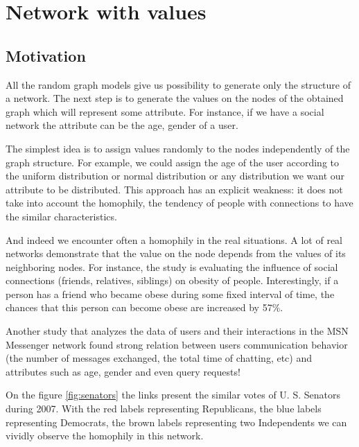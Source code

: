 \documentclass[12pt]{report}
\begin{document}
\section{Network with values}

\subsection{Motivation}

All the random graph models give us possibility to generate only the structure of a network. The next step is to generate the values on the nodes of the obtained graph which will represent some attribute. For instance, if we have a social network the attribute can be the age, gender of a user.  

The simplest idea is to assign values randomly to the nodes independently of the graph structure. For example, we could assign the age of the user according to the uniform distribution or normal distribution or any distribution we want our attribute to be distributed. This approach has an explicit weakness: it does not take into account the homophily, the tendency of people with connections to have the similar characteristics.

And indeed we encounter often a homophily in the real situations. A lot of real networks demonstrate that the value on the node depends from the values of its neighboring nodes. For instance, the study \cite{christakis2007spread} is evaluating the influence of social connections (friends, relatives, siblings) on obesity of people. Interestingly, if a person has a friend who became obese during some fixed interval of time, the chances that this person can become obese are increased by 57\%. 

Another study \cite{singla2008yes} that analyzes the data of users and their interactions in the MSN Messenger network found strong relation between users communication behavior (the number of messages exchanged, the total time of chatting, etc) and attributes such as age, gender and even query requests!

On the figure \ref{fig:senators} the links present the similar votes of U. S. Senators during 2007. With the red labels representing Republicans, the blue labels representing Democrats, the brown labels representing two Independents we can vividly observe the homophily in this network.
\end{document}
